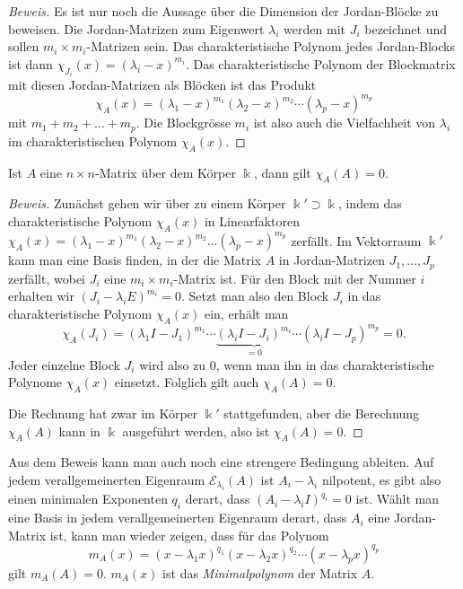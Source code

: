 \begin{proof}[Beweis]
Es ist nur noch die Aussage über die Dimension der Jordan-Blöcke zu
beweisen.
Die Jordan-Matrizen zum Eigenwert $\lambda_i$ werden mit $J_i$
bezeichnet und sollen $m_i\times m_i$-Matrizen sein.
Das charakteristische Polynom jedes Jordan-Blocks ist dann
$\chi_{J_i}(x)=(\lambda_i-x)^{m_i}$.
Das charakteristische Polynom der Blockmatrix mit diesen Jordan-Matrizen
als Blöcken ist das Produkt
\[
\chi_A(x)
=
(\lambda_1-x)^{m_1}
(\lambda_2-x)^{m_2}
\cdots
(\lambda_p-x)^{m_p}
\]
mit $m_1+m_2+\dots+m_p$.
Die Blockgrösse $m_i$ ist also auch die Vielfachheit von $\lambda_i$ im
charakteristischen Polynom $\chi_A(x)$.
\end{proof}



\begin{satz}
\label{buch:normalformen:satz:cayley-hamilton}
Ist $A$ eine $n\times n$-Matrix über dem Körper $\Bbbk$, dann gilt
$\chi_A(A)=0$.
\end{satz}

\begin{proof}[Beweis]
Zunächst gehen wir über zu einem Körper $\Bbbk'\supset\Bbbk$, indem
das charakteristische Polynom $\chi_A(x)$ in Linearfaktoren
$\chi_A(x)
=
(\lambda_1-x)^{m_1}
(\lambda_2-x)^{m_2}
\dots
(\lambda_p-x)^{m_p}$
zerfällt.
Im Vektorraum $\Bbbk'$ kann man eine Basis finden, in der die Matrix
$A$ in Jordan-Matrizen $J_1,\dots,J_p$ zerfällt, wobei $J_i$ eine
$m_i\times m_i$-Matrix ist.
Für den Block mit der Nummer $i$ erhalten wir
$(J_i - \lambda_i E)^{m_i} = 0$.
Setzt man also den Block $J_i$ in das charakteristische Polynom
$\chi_A(x)$ ein, erhält man
\[
\chi_A(J_i)
=
(\lambda_1I - J_1)^{m_1}
\cdots
\underbrace{
(\lambda_iI - J_i)^{m_i}
}_{\displaystyle=0}
\cdots
(\lambda_iI - J_p)^{m_p}
=
0.
\]
Jeder einzelne Block $J_i$ wird also zu $0$, wenn man ihn in das
charakteristische Polynome $\chi_A(x)$ einsetzt.
Folglich gilt auch $\chi_A(A)=0$.

Die Rechnung hat zwar im Körper $\Bbbk'$ stattgefunden, aber die Berechnung
$\chi_A(A)$ kann in $\Bbbk$ ausgeführt werden, also ist $\chi_A(A)=0$.
\end{proof}

Aus dem Beweis kann man auch noch eine strengere Bedingung ableiten.
Auf jedem verallgemeinerten Eigenraum $\mathcal{E}_{\lambda_i}(A)$
ist $A_i-\lambda_i$ nilpotent, es gibt also einen minimalen Exponenten
$q_i$ derart, dass $(A_i-\lambda_iI)^{q_i}=0$ ist.
Wählt man eine Basis in jedem verallgemeinerten Eigenraum derart,
dass $A_i$ eine Jordan-Matrix ist, kann man wieder zeigen, dass
für das Polynom
\[
m_A(x)
=
(x-\lambda_1x)^{q_1}
(x-\lambda_2x)^{q_2}
\cdots
(x-\lambda_px)^{q_p}
\]
gilt $m_A(A)=0$.
$m_A(x)$ ist das {\em Minimalpolynom} der Matrix $A$.
%

